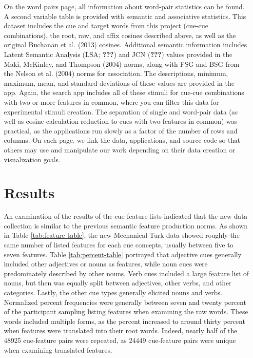 \documentclass[english,man]{apa6}
\theoremstyle{definition}
\theoremstyle{definition}
\theoremstyle{definition}
\theoremstyle{remark}
\begin{document}
On the word pairs page, all information about word-pair statistics can
be found. A second variable table is provided with semantic and
associative statistics. This dataset includes the cue and target words
from this project (cue-cue combinations), the root, raw, and affix
cosines described above, as well as the original Buchanan et al. (2013)
cosines. Additional semantic information includes Latent Semantic
Analysis (LSA; {\textbf{???}}) and JCN ({\textbf{???}}) values provided
in the Maki, McKinley, and Thompson (2004) norms, along with FSG and BSG
from the Nelson et al. (2004) norms for association. The descriptions,
minimum, maximum, mean, and standard deviations of these values are
provided in the app. Again, the search app includes all of these stimuli
for cue-cue combinations with two or more features in common, where you
can filter this data for experimental stimuli creation. The separation
of single and word-pair data (as well as cosine calculation reduction to
cues with two features in common) was practical, as the applications run
slowly as a factor of the number of rows and columns. On each page, we
link the data, applications, and source code so that others may use and
manipulate our work depending on their data creation or visualization
goals.

\section{Results}\label{results}

An examination of the results of the cue-feature lists indicated that
the new data collection is similar to the previous semantic feature
production norms. As shown in Table \ref{tab:feature-table}, the new
Mechanical Turk data showed roughly the same number of listed features
for each cue concepts, usually between five to seven features. Table
\ref{tab:percent-table} portrayed that adjective cues generally included
other adjectives or nouns as features, while noun cues were
predominately described by other nouns. Verb cues included a large
feature list of nouns, but then was equally split between adjectives,
other verbs, and other categories. Lastly, the other cue types generally
elicited nouns and verbs. Normalized percent frequencies were generally
between seven and twenty percent of the participant sampling listing
features when examining the raw words. These words included multiple
forms, as the percent increased to around thirty percent when features
were translated into their root words. Indeed, nearly half of the 48925
cue-feature pairs were repeated, as 24449 cue-feature pairs were unique
when examining translated features.
\end{document}
